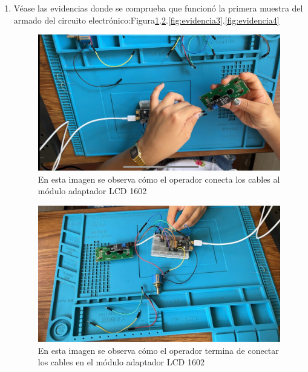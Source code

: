     \begin{enumerate}
    \item Véase las evidencias donde se comprueba que funcionó la primera muestra del armado del circuito electrónico:Figura\ref{fig:evidencia1}.\ref{fig:evidencia2}.\ref{fig:evidencia3}.\ref{fig:evidencia4}
    \begin{figure}[H]
        \centering
        \includegraphics[trim = {1mm 1mm 1mm 1mm},clip,scale=0.4]{3/Img/evidencia1.png}
        \caption{En esta imagen se observa cómo el operador conecta los cables al módulo adaptador LCD 1602} 
        \label{fig:evidencia1}
    \end{figure}
    \begin{figure}[H]
        \centering
        \includegraphics[trim = {1mm 1mm 1mm 1mm},clip,scale=0.4]{3/Img/evidencia2.png}
        \caption{En esta imagen se observa cómo el operador termina de conectar los cables en el módulo adaptador LCD 1602} 
        \label{fig:evidencia2}
    \end{figure}
    \begin{figure}[H]

\end{figure}
\end{enumerate}
